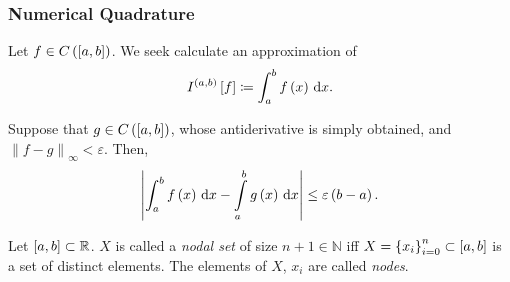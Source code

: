 \begin{frame}
    \frametitle{
        Numerical Quadrature~\cite[p.~397]{salgado_classical_2022}
    }

    Let
    \begin{math}
        f\in
        C\left(\left[a,b\right]\right)
    \end{math}.
    We seek calculate an approximation of
    \begin{equation*}
        I^{\left(a,b\right)}
        \left[f\right]\coloneqq
        \int_{a}^{b}
        f\left(x\right)
        \dl x.
    \end{equation*}

    Suppose that
    \begin{math}
        g\in
        C\left(\left[a,b\right]\right)
    \end{math},
    whose antiderivative is simply obtained, and
    \begin{math}
        {\left\|f-g\right\|}_{\infty}<
        \varepsilon
    \end{math}.
    Then,
    \begin{equation*}
        \left|
        \int_{a}^{b}
        f\left(x\right)
        \dl x-
        \int\limits_{a}^{b}
        g\left(x\right)
        \dl x
        \right|\leq
        \varepsilon
        \left(b-a\right).
    \end{equation*}

    \begin{definition}
        Let
        \begin{math}
            \left[a,b\right]\subset
            \mathbb{R}
        \end{math}.
        $X$ is called a \emph{nodal set} of size $n+1\in\mathbb{N}$
        iff
        \begin{math}
            X={\left\{x_{i}\right\}}_{i=0}^{n}\subset
            \left[a,b\right]
        \end{math}
        is a set of distinct elements.
        The elements of $X$, $x_{i}$ are called \emph{nodes}.
    \end{definition}


\end{frame}

